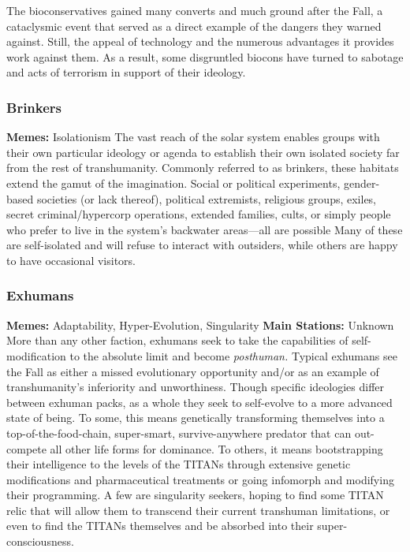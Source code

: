 The bioconservatives gained many converts and 
much ground after the Fall, a cataclysmic event 
that served as a direct example of the dangers they 
warned against. Still, the appeal of technology and 
the numerous advantages it provides work against 
them. As a result, some disgruntled biocons have 
turned to sabotage and acts of terrorism in support 
of their ideology.

\subsubsection{Brinkers}

\textbf{Memes:} Isolationism
The vast reach of the solar system enables groups 
with their own particular ideology or agenda to establish
their own isolated society far from the rest
of transhumanity. Commonly referred to as brinkers, 
these habitats extend the gamut of the imagination. 
Social or political experiments, gender-based societies
(or lack thereof), political extremists, religious
groups, exiles, secret criminal/hypercorp operations, 
extended families, cults, or simply people who prefer 
to live in the system's backwater areas—all are possible
Many of these are self-isolated and will refuse
to interact with outsiders, while others are happy to 
have occasional visitors.

\subsubsection{Exhumans}

\textbf{Memes:} Adaptability, Hyper-Evolution, Singularity
\textbf{Main Stations:} Unknown
More than any other faction, exhumans seek to take 
the capabilities of self-modification to the absolute 
limit and become \textit{posthuman.} Typical exhumans see 
the Fall as either a missed evolutionary opportunity 
and/or as an example of transhumanity's inferiority 
and unworthiness. Though specific ideologies differ 
between exhuman packs, as a whole they seek to self-evolve
to a more advanced state of being. To some,
this means genetically transforming themselves into a 
top-of-the-food-chain, super-smart, survive-anywhere 
predator that can out-compete all other life forms 
for dominance. To others, it means bootstrapping 
their intelligence to the levels of the TITANs through 
extensive genetic modifications and pharmaceutical 
treatments or going infomorph and modifying their 
programming. A few are singularity seekers, hoping 
to find some TITAN relic that will allow them to transcend
their current transhuman limitations, or even
to find the TITANs themselves and be absorbed into 
their super-consciousness.

